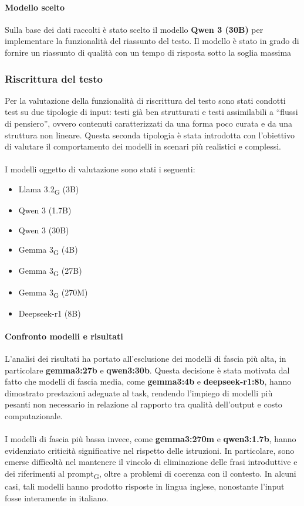 \documentclass[11pt,a4paper]{article}
\newcommand{\gls}[1]{#1\textsubscript{G}}
\begin{document}
\paragraph{Modello scelto} Sulla base dei dati raccolti è stato scelto il modello \textbf{Qwen 3 (30B)} per implementare la funzionalità del riassunto del testo. Il modello è stato in grado di fornire un riassunto di qualità con un tempo di risposta sotto la soglia massima

\subsubsection{Riscrittura del testo}
Per la valutazione della funzionalità di riscrittura del testo sono stati condotti test su due tipologie di input: testi già ben strutturati e testi assimilabili a “flussi di pensiero”, ovvero contenuti caratterizzati da una forma poco curata e da una struttura non lineare. Questa seconda tipologia è stata introdotta con l’obiettivo di valutare il comportamento dei modelli in scenari più realistici e complessi.\\\\
I modelli oggetto di valutazione sono stati i seguenti:
\begin{itemize}
    \item \gls{Llama 3.2} (3B)
    \item Qwen 3 (1.7B)
    \item Qwen 3 (30B)
    \item \gls{Gemma 3} (4B)
    \item \gls{Gemma 3} (27B)
    \item \gls{Gemma 3} (270M)
    \item Deepseek-r1 (8B)
\end{itemize}

\paragraph{Confronto modelli e risultati}
L’analisi dei risultati ha portato all’esclusione dei modelli di fascia più alta, in particolare \textbf{gemma3:27b} e \textbf{qwen3:30b}. Questa decisione è stata motivata dal fatto che modelli di fascia media, come \textbf{gemma3:4b} e \textbf{deepseek-r1:8b}, hanno dimostrato prestazioni adeguate al task, rendendo l’impiego di modelli più pesanti non necessario in relazione al rapporto tra qualità dell’output e costo computazionale.\\\\
I modelli di fascia più bassa invece, come \textbf{gemma3:270m} e \textbf{qwen3:1.7b}, hanno evidenziato criticità significative nel rispetto delle istruzioni. In particolare, sono emerse difficoltà nel mantenere il vincolo di eliminazione delle frasi introduttive e dei riferimenti al \gls{prompt}, oltre a problemi di coerenza con il contesto. In alcuni casi, tali modelli hanno prodotto risposte in lingua inglese, nonostante l’input fosse interamente in italiano.
\end{document}
